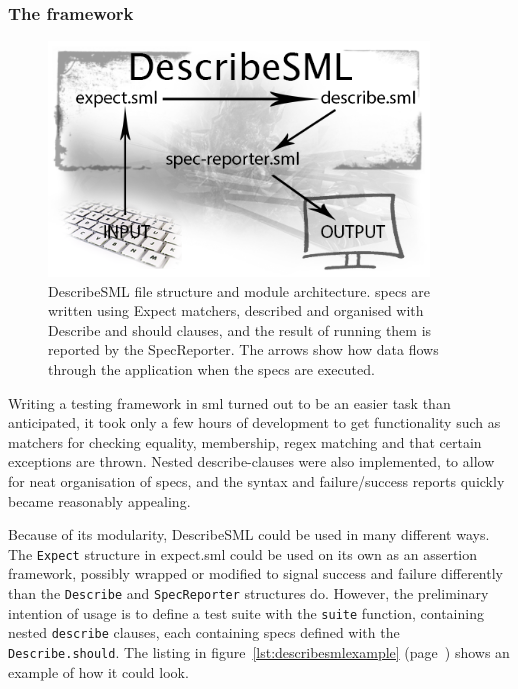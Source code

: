 \documentclass[11pt]{article}
\begin{document}
\subsubsection{The framework}

\begin{figure}[ht!]
\centering
\includegraphics[width=0.9\textwidth]{pics/DescribeSML.png}
\caption{DescribeSML file structure and module architecture. \Glspl{spec} are written using Expect \glspl{matcher}, described and organised with Describe and should clauses, and the result of running them is reported by the SpecReporter. The arrows show how data flows through the application when the \glspl{spec} are executed.}
\label{fig:describesml}
\end{figure}

Writing a testing framework in \gls{sml} turned out to be an easier task than anticipated, it took only a few hours of development to get functionality such as \glspl{matcher} for checking equality, membership, regex matching and that certain exceptions are thrown. Nested describe-clauses were also implemented, to allow for neat organisation of \glspl{spec}, and the syntax and failure/success reports quickly became reasonably appealing.

Because of its modularity, DescribeSML could be used in many different ways. The \texttt{Expect} structure in expect.sml could be used on its own as an assertion framework, possibly wrapped or modified to signal success and failure differently than the \texttt{Describe} and \texttt{SpecReporter} structures do. However, the preliminary intention of usage is to define a test suite with the \texttt{suite} function, containing nested \texttt{describe} clauses, each containing \glspl{spec} defined with the \texttt{Describe.should}. The listing in figure~\ref{lst:describesmlexample} (page~\pageref{lst:describesmlexample}) shows an example of how it could look.
\end{document}
